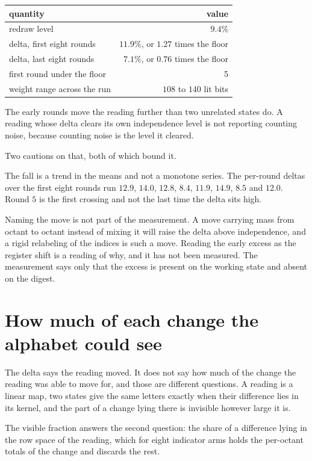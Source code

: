 \begin{center}
\begin{tabular}{@{}lr@{}}
\toprule
quantity & value \\
\midrule
redraw level & \(9.4\%\) \\
delta, first eight rounds & \(11.9\%\), or \(1.27\) times the floor \\
delta, last eight rounds & \(7.1\%\), or \(0.76\) times the floor \\
first round under the floor & 5 \\
weight range across the run & \(108\) to \(140\) lit bits \\
\bottomrule
\end{tabular}
\end{center}

The early rounds move the reading further than two unrelated states do. A reading whose delta clears its own independence level is not reporting counting noise, because counting noise is the level it cleared.

Two cautions on that, both of which bound it.

The fall is a trend in the means and not a monotone series. The per-round deltas over the first eight rounds run \(12.9\), \(14.0\), \(12.8\), \(8.4\), \(11.9\), \(14.9\), \(8.5\) and \(12.0\). Round \(5\) is the first crossing and not the last time the delta sits high.

Naming the move is not part of the measurement. A move carrying mass from octant to octant instead of mixing it will raise the delta above independence, and a rigid relabeling of the indices is such a move. Reading the early excess as the register shift is a reading of why, and it has not been measured. The measurement says only that the excess is present on the working state and absent on the digest.

\section{How much of each change the alphabet could see}

The delta says the reading moved. It does not say how much of the change the reading was able to move for, and those are different questions. A reading is a linear map, two states give the same letters exactly when their difference lies in its kernel, and the part of a change lying there is invisible however large it is.

The visible fraction answers the second question: the share of a difference lying in the row space of the reading, which for eight indicator arms holds the per-octant totals of the change and discards the rest.

